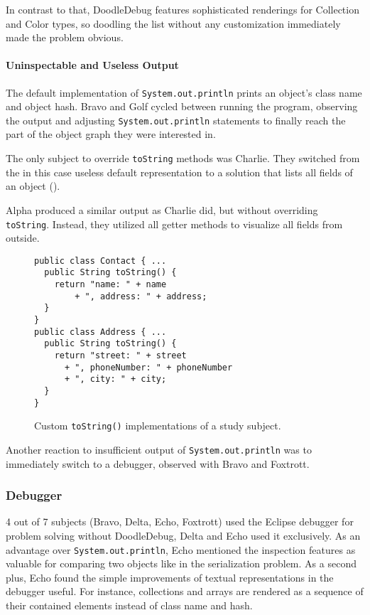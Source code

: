 \documentclass[english]{scrartcl}
\newcommand{\DD}{Dood\-le\-De\-bug\xspace}
\newcommand{\println}{\texttt{Sys\-tem.\-out.\-println}\xspace}
\begin{document}
In contrast to that, \DD features sophisticated renderings for Collection and Color types, so doodling the list without any customization immediately made the problem obvious.

\paragraph{Uninspectable and Useless Output}
The default implementation of \println prints an object's class name and object hash.
Bravo and Golf cycled between running the program, observing the output and adjusting \println statements to finally reach the part of the object graph they were interested in.

The only subject to override \texttt{toString} methods was Charlie.
They switched from the in this case useless default representation to a solution that lists all fields of an object ().

Alpha produced a similar output as Charlie did, but without overriding \texttt{toString}.
Instead, they utilized all getter methods to visualize all fields from outside.

\begin{figure}[h]
\begin{lstlisting}
public class Contact { ...
  public String toString() { 
    return "name: " + name 
        + ", address: " + address;
  }
}
public class Address { ...
  public String toString() {
    return "street: " + street
      + ", phoneNumber: " + phoneNumber
      + ", city: " + city;
  }
}
\end{lstlisting}
  \caption{Custom \texttt{toString()} implementations of a study subject.}
\end{figure}

Another reaction to insufficient output of \println was to immediately switch to a debugger, observed with Bravo and Foxtrott.

\subsubsection{Debugger}
4 out of 7 subjects (Bravo, Delta, Echo, Foxtrott) used the Eclipse debugger for problem solving without \DD, Delta and Echo used it exclusively.
As an advantage over \println, Echo mentioned the inspection features as valuable for comparing two objects like in the serialization problem.
As a second plus, Echo found the simple improvements of textual representations in the debugger useful.
For instance, collections and arrays are rendered as a sequence of their contained elements instead of class name and hash.
\end{document}
